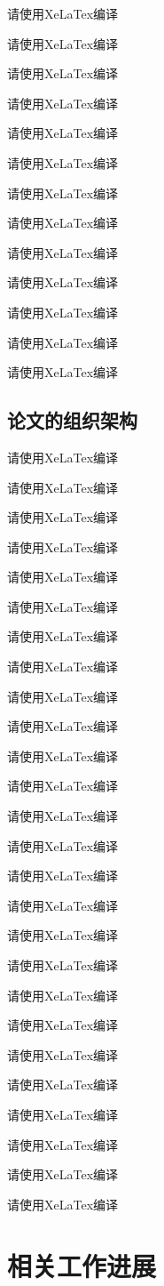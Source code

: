 \documentclass{ctexart}
\numberwithin{figure}{section}
\numberwithin{table}{section}
\numberwithin{equation}{section}
\begin{document}
请使用XeLaTex编译

请使用XeLaTex编译

请使用XeLaTex编译

请使用XeLaTex编译

请使用XeLaTex编译

请使用XeLaTex编译

请使用XeLaTex编译

请使用XeLaTex编译

请使用XeLaTex编译

请使用XeLaTex编译

请使用XeLaTex编译

请使用XeLaTex编译

请使用XeLaTex编译
\subsection{论文的组织架构}
请使用XeLaTex编译

请使用XeLaTex编译

请使用XeLaTex编译

请使用XeLaTex编译

请使用XeLaTex编译

请使用XeLaTex编译

请使用XeLaTex编译

请使用XeLaTex编译

请使用XeLaTex编译

请使用XeLaTex编译

请使用XeLaTex编译

请使用XeLaTex编译

请使用XeLaTex编译

请使用XeLaTex编译

请使用XeLaTex编译

请使用XeLaTex编译

请使用XeLaTex编译

请使用XeLaTex编译

请使用XeLaTex编译

请使用XeLaTex编译

请使用XeLaTex编译

请使用XeLaTex编译

请使用XeLaTex编译

请使用XeLaTex编译

请使用XeLaTex编译

请使用XeLaTex编译
\newpage
\section{相关工作进展}
\end{document}
